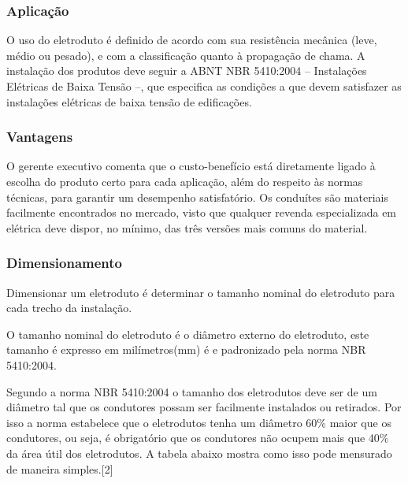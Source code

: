 \subsubsection{Aplicação}

O uso do eletroduto é definido de acordo com sua resistência mecânica (leve, médio ou pesado), e com a classificação quanto à propagação de chama. A instalação dos produtos deve seguir a ABNT NBR 5410:2004 – Instalações Elétricas de Baixa Tensão –, que especifica as condições a que devem satisfazer as instalações elétricas de baixa tensão de edificações.

\subsubsection{Vantagens}

O gerente executivo comenta que o custo-benefício está diretamente ligado à escolha do produto certo para cada aplicação, além do respeito às normas técnicas, para garantir um desempenho satisfatório.  Os conduítes são materiais facilmente encontrados no mercado, visto que qualquer revenda especializada em elétrica deve dispor, no mínimo, das três versões mais comuns do material.

\subsubsection{Dimensionamento}

Dimensionar um eletroduto é determinar o tamanho nominal do eletroduto para cada trecho da instalação.

O tamanho nominal do eletroduto é o diâmetro externo do eletroduto, este tamanho é expresso em milímetros(mm) é e padronizado pela norma NBR 5410:2004.

Segundo a norma NBR 5410:2004 o tamanho dos eletrodutos deve ser de um diâmetro tal que os condutores possam ser facilmente instalados ou retirados. Por isso a norma estabelece que o eletrodutos tenha um diâmetro 60\% maior que os condutores, ou seja, é obrigatório que os condutores não ocupem mais que 40\% da área útil dos eletrodutos. A tabela abaixo mostra como isso pode mensurado de maneira simples.[2]


